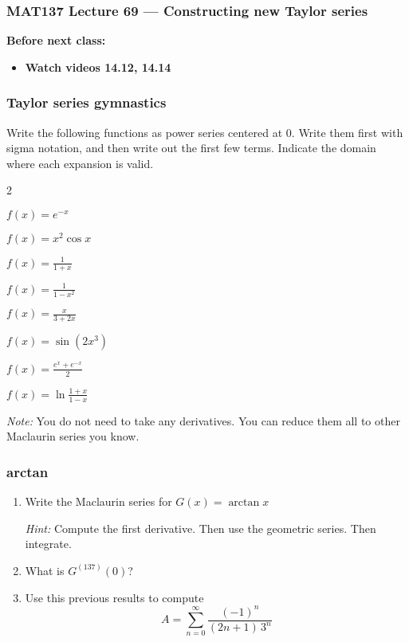 \documentclass[14pt]{beamer}
\newcommand{\p}{\pause}
\newcommand{\setsize}[1]{\fontsize{#1}{#1}\selectfont} %
\newcommand{\smallerfont}{\setsize{13}} %
\newcommand{\vvv}{\vspace{.2cm}}
\begin{document}
\begin{frame}
	\frametitle{MAT137 Lecture 69 --- Constructing new Taylor series}

	\vfill
	{\bf Before next class:}
		\begin{itemize} \normalsize
			\item {\bf Watch videos 14.12, 14.14 }
		\end{itemize}
\end{frame}


	\begin{frame}[t]
		\smallerfont
		\frametitle{Taylor series gymnastics}

		Write the following functions as power series centered at $0$. Write them first
		with sigma notation, and then write out the first few terms. Indicate the domain
		where each expansion is valid.

		\begin{enumerate}
		\end{enumerate}
		\vvv

		\emph{Note:} You do not need to take any derivatives. You can reduce them
		all to other Maclaurin series you know.
	\end{frame}

	\begin{frame}[t]
		\frametitle{arctan}

		\begin{enumerate}
			\item Write the Maclaurin series for \; ${\displaystyle G(x) = \arctan x}$
				\vvv

				\emph{Hint:} Compute the first derivative. Then use the geometric series.
				Then integrate. \vvv

				\p

			\item What is ${\displaystyle G^{(137)}(0)}$? \vvv

				\p

			\item Use this previous results to compute
				\[
					A = \sum_{n=0}^{\infty}\frac{(-1)^{n}}{(2n+1) \, 3^{n} }
				\]
		\end{enumerate}
	\end{frame}
\end{document}
